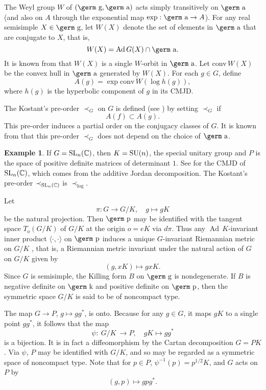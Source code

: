 \documentclass[12pt, reqno]{amsart}
\numberwithin{equation}{section}
\theoremstyle{definition}
\newtheorem{example}[theorem]{Example}
\def\SU{{\rm SU}}
\def\SL{{\rm SL}}
\def\a{\mbox{\germ a}}
\def\g{\mbox{\germ g}}
\def\k{\mbox{\germ k}}
\def\p{\mbox{\germ p}}
\def\C{\mathbb C}
\def\Ad{{\operatorname{Ad}\,}}
\begin{document}
The Weyl group $W$ of $(\g, \a)$ acts simply transitively on $\a$ (and also on $A$ through the exponential map $\exp: \a \to A$).
For any real semisimple $X \in \g$, let $W(X)$ denote the set of elements in $\a$ that are conjugate to $X$, that is,
\[
W(X) = \Ad G(X) \cap \a.
\]
It is known from \cite[Proposition 2.4]{Ko73} that  $W(X)$ is a single $W$-orbit in $\a$.
Let conv\,$W(X)$ be the convex hull in $\a$ generated by $W(X)$. For each $g \in G$, define
\[
A(g) =\exp\mbox{conv}\, W(\log h(g)),
\]
where $h(g)$ is the hyperbolic component of $g$ in its CMJD.

The Kostant's pre-order $\prec_G$ on $G$  is defined (see \cite[p.426]{Ko73}) by setting  $\prec_G$ if 
\[
A(f) \subset A(g).
\]
This pre-order induces a partial order on the conjugacy classes of $G$. It is known from \cite[Theorem 3.1] {Ko73} that this pre-order $\prec_G$ does not  depend on the choice of $\a$. 

\begin{example}
If $G = \SL_n(\C)$, then $K = \SU(n)$, the special unitary group and $P$ is the space of positive definite matrices of determinant $1$. See \cite [p.430-431]{He78} for the CMJD of  $\SL_n(\C)$, which comes from the additive Jordan decomposition. The Kostant's pre-order   $\prec_ {\SL_n(\C)}$  is $\prec_{\log}$.
\end{example}

Let
\[ 
\pi: G\to G/K, \quad g\mapsto gK
\]
be the natural projection. Then $\p$ may be identified with the tangent space $T_o(G/K)$ of $G/K$ at the origin $o=eK$ via $d\pi$. Thus any $\Ad K$-invariant inner product $\langle\cdot,\cdot\rangle$ on $\p$ induces a unique $G$-invariant Riemannian metric on $G/K$ \cite [p.208-209]{He78}, that is, a Riemannian metric invariant under the natural action of $G$ on $G/K$ given by 
\[
(g,xK)\mapsto gxK.
\] Since $G$ is semisimple, the Killing form $B$ on $\g$ is nondegenerate. If $B$ is negative definite on $\k$ and positive definite  on $\p$, then the symmetric space $G/K$ is said to be of noncompact type. 

The map $G\to P$, $g\mapsto gg^*$, is onto. Because for any $g\in G$, it maps $gK$ to a single point $gg^*$, it follows that the map
\begin{equation}
\psi:\ G/K\ \to P, \quad gK \mapsto gg^* \label{mappsi}
\end{equation}
is a bijection. It is in fact a diffeomorphism by the Cartan decomposition $G=PK$. Via $\psi$, $P$ may
be identified with $G/K$, and so may be regarded as a symmetric space of noncompact type. Note that
for $p\in P$, $\psi^{-1}(p)=p^{1/2}K$, and $G$ acts on $P$ by 
\begin{equation}\label{G-action}
(g,p)\mapsto gpg^*.
\end{equation}
\end{document}
